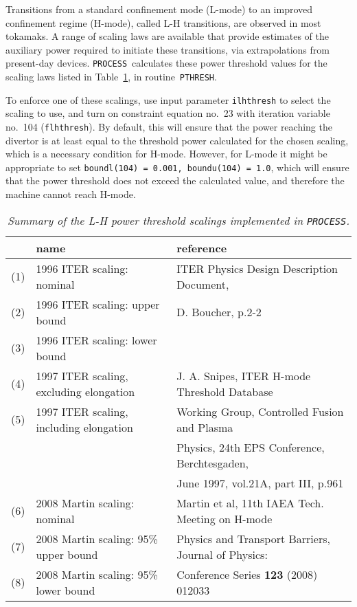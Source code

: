 \documentclass[11pt,a4paper]{report}
\newcommand{\process}{\mbox{\texttt{PROCESS}}}
\begin{document}
Transitions from a standard confinement mode (L-mode) to an improved
confinement regime (H-mode), called L-H transitions, are observed in most
tokamaks. A range of scaling laws are available that provide estimates of the
auxiliary power required to initiate these transitions, via extrapolations
from present-day devices. \process\ calculates these power threshold values
for the scaling laws listed in Table~\ref{tab:power_thresholds}, in
routine~\texttt{PTHRESH}.

To enforce one of these scalings, use input parameter \texttt{ilhthresh} to
select the scaling to use, and turn on constraint equation no.\ 23 with
iteration variable no.\ 104 (\texttt{flhthresh}). By default, this will ensure
that the power reaching the divertor is at least equal to the threshold power
calculated for the chosen scaling, which is a necessary condition for
H-mode. However, for L-mode it might be appropriate to set \texttt{boundl(104)
  = 0.001, boundu(104) = 1.0}, which will ensure that the power threshold does
not exceed the calculated value, and therefore the machine cannot reach
H-mode.


\begin{table}[tbph]
\small
\begin{center}
\begin{tabular}{||c||l||l||} \hline
 & name & reference \\ \hline
(1) & 1996 ITER scaling: nominal & ITER Physics Design Description Document, \\
(2) & 1996 ITER scaling: upper bound & D. Boucher, p.2-2 \\
(3) & 1996 ITER scaling: lower bound &  \\ \hline
(4) & 1997 ITER scaling, excluding elongation & J. A. Snipes, ITER H-mode
Threshold Database \\
(5) & 1997 ITER scaling, including elongation &  Working Group, Controlled
Fusion and Plasma \\
 & & Physics, 24th EPS Conference, Berchtesgaden, \\
 & & June 1997, vol.21A, part III, p.961 \\ \hline
(6) & 2008 Martin scaling: nominal & Martin et al, 11th IAEA Tech. Meeting on
H-mode \\
(7) & 2008 Martin scaling: 95\% upper bound &  Physics and Transport Barriers,
Journal of Physics: \\
(8) & 2008 Martin scaling: 95\% lower bound & Conference Series \textbf{123}
(2008) 012033 \\
\hline
\end{tabular}
\end{center}
\normalsize
\caption[List of available L-H power threshold scalings]
{\label{tab:power_thresholds}
  \textit{Summary of the L-H power threshold scalings implemented in \process.}
}
\end{table}
\end{document}
